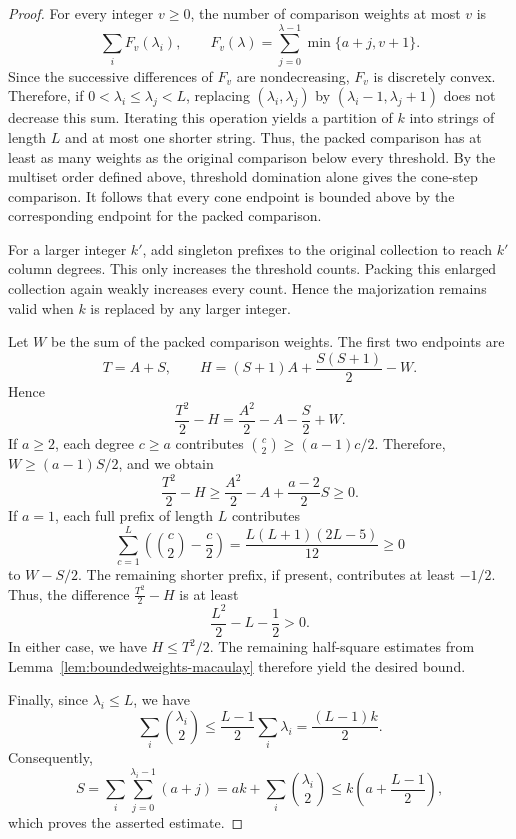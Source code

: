 \documentclass[12pt]{amsart}
\numberwithin{equation}{section}
\theoremstyle{definition}
\theoremstyle{remark}
\numberwithin{equation}{section}
\begin{document}
\begin{proof}
For every integer $v\ge0$, the number of comparison weights at most $v$
is
\[
\sum_i F_v(\lambda_i),\qquad
F_v(\lambda)=\sum_{j=0}^{\lambda-1}\min\{a+j,v+1\}.
\]
Since the successive differences of $F_v$ are nondecreasing, $F_v$ is discretely convex. Therefore, if $0<\lambda_i\le\lambda_j<L$, replacing $(\lambda_i,\lambda_j)$ by $(\lambda_i-1,\lambda_j+1)$ does not
decrease this sum.  Iterating this operation yields a partition of $k$ into strings of length $L$ and at most one shorter string.
Thus, the packed comparison has at least as many weights as the original comparison below every threshold.   By the multiset order defined above, threshold domination alone gives the cone-step comparison. It follows that every cone endpoint is bounded above by the corresponding endpoint for the packed comparison.

 For a larger integer $k'$, add singleton prefixes to the original collection to reach $k'$ column degrees. This only increases the threshold counts. Packing this enlarged collection again weakly increases every count.  Hence the majorization remains valid when $k$ is replaced by any larger integer.

	Let $W$ be the sum of the packed comparison weights. The first two endpoints are
	\[
	T=A+S,\qquad H=(S+1)A+\frac{S(S+1)}{2}-W.
	\]
	Hence
	\[
	\frac{T^2}{2}-H=\frac{A^2}{2}-A-\frac{S}{2}+W.
	\]
	If $a\ge2$, each degree $c\ge a$ contributes $\binom c2\ge(a-1)c/2$. Therefore, $W\ge(a-1)S/2$, and  we obtain
	\[
	\frac{T^2}{2}-H
	\ge \frac{A^2}{2}-A+\frac{a-2}{2}S
	\ge0.
	\]
	If $a=1$, each full prefix of length $L$ contributes
	\[
	\sum_{c=1}^L\left(\binom c2-\frac c2\right)
	=\frac{L(L+1)(2L-5)}{12}\ge0
	\]
	to $W-S/2$. The remaining shorter prefix, if present, contributes at least $-1/2$. Thus, the difference $\frac{T^2}{2}-H$ is at least
	\[
	\frac{L^2}{2}-L-\frac12>0.
	\]
In either case, we have $H\le T^2/2$. The remaining half-square estimates from Lemma~\ref{lem:boundedweights-macaulay} therefore yield the desired bound.
	
Finally,  since $\lambda_i\le L$, we have
	\[
	\sum_i\binom{\lambda_i}{2}
	\le\frac{L-1}{2}\sum_i\lambda_i
	=\frac{(L-1)k}{2}.
	\]
	Consequently,
	\[
	S=\sum_i\sum_{j=0}^{\lambda_i-1}(a+j)
	=ak+\sum_i\binom{\lambda_i}{2}
	\le k\left(a+\frac{L-1}{2}\right),
	\]
	which proves the asserted estimate.
\end{proof}
\end{document}
